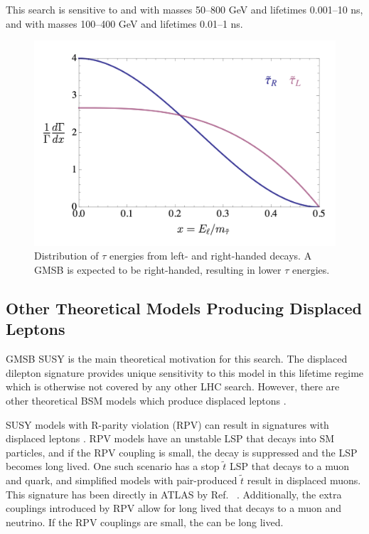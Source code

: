 This search is sensitive to \selec and \smu with masses 50--800 GeV and lifetimes 0.001--10 ns, and \stau with masses 100--400 GeV and lifetimes 0.01--1 ns.

\begin{figure}[!h]
\centering
\includegraphics[width=.7\textwidth]{figures/theory/tau-pt.png}
\caption{Distribution of $\tau$ energies from left- and right-handed \stau decays. A \ac{GMSB} \stau is expected to be right-handed, resulting in lower $\tau$ energies. \cite{jesseshelton}}
\label{fig:taupt}
\end{figure}

\subsection{Other Theoretical Models Producing Displaced Leptons}
\label{sec:othermodels}

\ac{GMSB} \ac{SUSY} is the main theoretical motivation for this search. The displaced dilepton signature provides unique sensitivity to this model in this lifetime regime which is otherwise not covered by any other \ac{LHC} search. However, there are other theoretical \ac{BSM} models which produce displaced leptons \cite{jesseshelton}.

\ac{SUSY} models with R-parity violation (RPV) can result in signatures with displaced leptons \cite{Barbier_2005}. RPV models have an unstable \ac{LSP} that decays into \ac{SM} particles, and if the RPV coupling is small, the decay is suppressed and the \ac{LSP} becomes long lived. One such scenario has a stop $\tilde{t}$ \ac{LSP} that decays to a muon and quark, and simplified models with pair-produced $\tilde{t}$ result in displaced muons. This signature has been directly in \ac{ATLAS} by Ref. ~\cite{dvplusmu}. Additionally, the extra couplings introduced by RPV allow for long lived \stau that decays to a muon and neutrino. If the RPV couplings are small, the \stau can be long lived.

